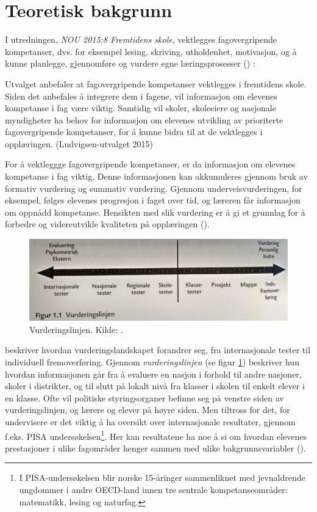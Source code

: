 \documentclass[main.tex]{subfiles}
\begin{document}
\section*{Teoretisk bakgrunn}
I utredningen, \emph{NOU 2015:8 Fremtidens skole}, vektlegges fagovergripende kompetanser, dvs. 
for eksempel lesing, skriving, utholdenhet, motivasjon, og å kunne planlegge, 
gjennomføre og vurdere egne læringsprosesser () :
\begin{displayquote}
Utvalget anbefaler at fagovergripende kompetanser vektlegges i fremtidens skole. Siden det  
anbefales å integrere dem i fagene, vil informasjon om elevenes kompetanse i fag være viktig.  
Samtidig vil skoler, skoleeiere og nasjonale myndigheter ha behov for informasjon om elevenes utvikling av 
prioriterte fagovergripende kompetanser, for å kunne bidra til at de vektlegges i opplæringen. 
(Ludvigsen-utvalget 2015)
\end{displayquote}
For å vektleggge fagovergripende kompetanser, er da informasjon om elevenes kompetanse i fag viktig. 
Denne informasjonen kan akkumuleres gjennom bruk av formativ vurdering og summativ vurdering.
Gjennom underveisvurderingen, for eksempel, følges elevenes progresjon i faget over tid, og læreren får informasjon
om oppnådd kompetanse. Hensikten med slik vurdering er å gi et grunnlag for å forbedre og videreutvikle  
kvaliteten på opplæringen ().

\begin{figure}[h!]
\centering
\includegraphics[scale = 0.1]{../figures/vurderingslinjen.png}
\caption{Vurderingslinjen. Kilde: \protect{}.}
\label{fig:smit09}
\end{figure}


 beskriver hvordan vurderingslandskapet forandrer seg, fra internasjonale tester til
individuell fremoverføring. Gjennom \emph{vurderingslinjen} (se figur \ref{fig:smit09}) beskriver hun
hvordan informasjonen går fra å evaluere en nasjon i forhold til andre nasjoner, skoler i distrikter, 
og til slutt på lokalt nivå fra klasser i skolen til enkelt elever i en klasse. Ofte vil politiske styringsorganer
befinne seg på venstre siden av vurderingslinjen, og lærere og elever på høyre siden. Men tiltross for det, 
for undervisere er det viktig å ha oversikt over internasjonale resultater, gjennom f.eks. PISA 
undersøkelsen\footnote{I  PISA-undersøkelsen blir norske 15-åringer sammenliknet med jevnaldrende ungdommer i 
andre OECD-land innen tre sentrale kompetanseområder: matematikk, lesing og naturfag.}. 
Her kan resultatene ha noe å si om hvordan elevenes prestasjoner i ulike fagområder henger sammen med ulike 
bakgrunnsvariabler (). 
\end{document}
